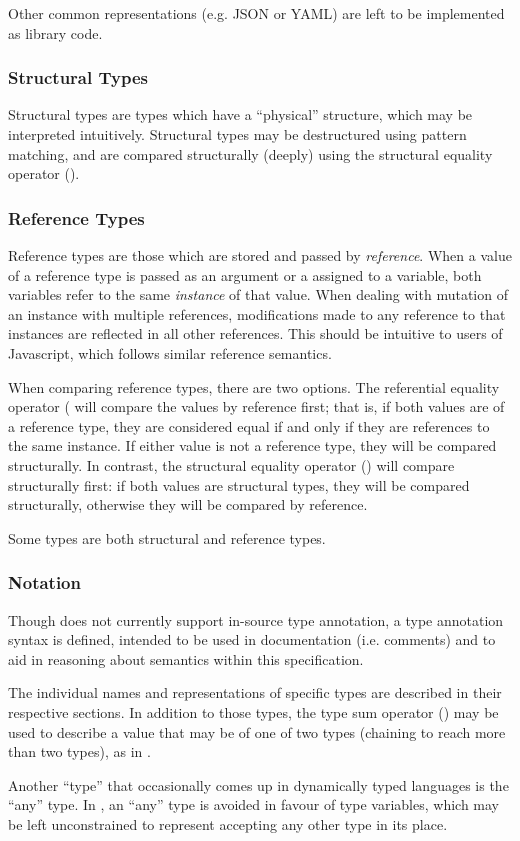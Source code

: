 Other common representations (e.g. JSON or YAML) are left
to be implemented as library code.

\subsubsection{Structural Types}

Structural types are types which have a ``physical'' structure, which may be
interpreted intuitively. Structural types may be destructured using pattern
matching, and are compared structurally (deeply) using the structural equality
operator (\op{==}).

\subsubsection{Reference Types}

Reference types are those which are stored and passed by \emph{reference}. When
a value of a reference type is passed as an argument or a assigned to a variable, both
variables refer to the same \emph{instance} of that value. When dealing with
mutation of an instance with multiple references, modifications made to any
reference to that instances are reflected in all other references. This should be
intuitive to users of Javascript, which follows similar reference semantics.

When comparing reference types, there are two options. The referential equality
operator (\op{===)} will compare the values by reference first; that is, if
both values are of a reference type, they are considered equal if and only
if they are references to the same instance. If either value is not a reference
type, they will be compared structurally. In contrast, the structural equality
operator (\kw{==}) will compare structurally first: if both values are structural
types, they will be compared structurally, otherwise they will be compared by
reference.

Some types are both structural and reference types.

\subsubsection{Notation}

Though \Trilogy{} does not currently support in-source type annotation, a
type annotation syntax is defined, intended to be used in documentation
(i.e. comments) and to aid in reasoning about semantics within this specification.

The individual names and representations of specific types are described
in their respective sections. In addition to those types, the type sum operator
(\op{|}) may be used to describe a value that may be of one of two types (chaining
to reach more than two types), as in .

Another ``type'' that occasionally comes up in dynamically typed languages is the
``any'' type. In \Trilogy{}, an ``any'' type is avoided in favour of type variables,
which may be left unconstrained to represent accepting any other type in its place.







